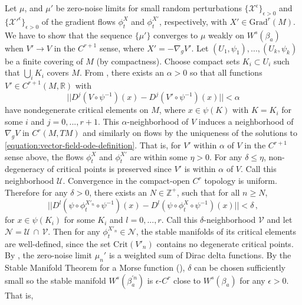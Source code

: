 \documentclass[10pt,a4paper]{amsart}
\renewenvironment{proof}{\par\noindent{\bf Proof\ }}{\hfill\BlackBox\\[2mm]}
\begin{document}
\begin{proof}
    Let $\mu$, and $\mu'$ be zero-noise limits for small random perturbations $\{ \mathcal{X^{\epsilon}}\}_{\epsilon >0}$ and $\{ \mathcal{X'^{\epsilon}}\}_{\epsilon >0}$ of the gradient flows $\phi_t^X$ and $\phi_t^{X'}$, respectively, with $X' \in \text{Grad}^r(M)$. We have to show that the sequence $\{\mu'\}$ converges to $\mu$ weakly on $W^s(\beta_a)$ when $V' \rightarrow V$ in the $C^{r+1}$ sense, where $X' = -\nabla_g V'$. Let $(U_1,\psi_1),...,(U_k,\psi_k)$ be a finite covering of $M$ (by compactness). Choose compact sets $K_i \subset U_i$ such that $\bigcup_i K_i$ covers $M$. From , there exists an $\alpha>0$ so that all 
    functions $V' \in C^{r+1}(M,\mathbb{R})$ with
    \begin{equation*}
        || D^j (V \circ \psi^{-1})(x) - D^j(V' \circ \psi^{-1})(x)|| < \alpha
    \end{equation*}
    have nondegenerate critical elements on $M$, where $x \in \psi(K)$ with $K = K_i$ for some $i$ and $j = 0,...,r+1$. This $\alpha$-neighborhood of $V$ induces a neighborhood of $\nabla_gV$ in $C^r(M,TM)$ and similarly on flows by the uniqueness of the solutions to \eqref{equation:vector-field-ode-definition}. That is, for $V'$ within $\alpha$ of $V$ in the $C^{r+1}$ sense above, the flows $\phi_t^X$ and $\phi_t^{X'}$ are within some $\eta >0$. For any $\delta \leq \eta$, non-degeneracy of critical points is preserved since $V'$ is within $\alpha$ of $V$. Call this neighborhood $\mathcal{U}$. Convergence in the compact-open $C^r$ topology is uniform. Therefore for any $\delta>0$, there exists an $N \in \mathbb{Z}^{+}$, such that for all $n \geq N$,
    \begin{equation*}
        || D^l (\psi \circ \phi_t^{X'_{n}} \circ \psi^{-1})(x) - D^l (\psi \circ \phi_t^{X} \circ \psi^{-1})(x) || < \delta \, ,
    \end{equation*}
    for $x \in \psi(K_i)$ for some $K_i$ and $l=0,...,r$. Call this $\delta$-neighborhood $\mathcal{V}$ and let $\mathcal{N = \mathcal{U} \, \cap \, \mathcal{V}}$. Then for any $\phi_t^{X'_{n}}\in \mathcal{N}$, the stable manifolds of its critical elements are well-defined, since the set $\text{Crit}(V'_{n})$ contains no degenerate critical points. By , the zero-noise limit $\mu_n'$ is a weighted sum of Dirac delta functions. By the Stable Manifold Theorem for a Morse function (), $\delta$ can be chosen sufficiently small so the stable manifold $W^s(\beta_a^{'n})$ is $\epsilon$-$C^r$ close to $W^s(\beta_a)$ for any $\epsilon > 0$. That is,

\end{proof}
\end{document}
